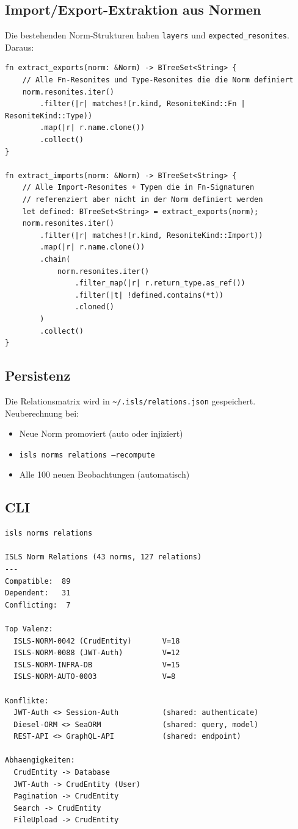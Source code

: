 \documentclass[11pt,a4paper]{article}
\begin{document}
\subsection{Import/Export-Extraktion aus Normen}

Die bestehenden Norm-Strukturen haben \texttt{layers} und \texttt{expected\_resonites}. Daraus:

\begin{lstlisting}[style=rust]
fn extract_exports(norm: &Norm) -> BTreeSet<String> {
    // Alle Fn-Resonites und Type-Resonites die die Norm definiert
    norm.resonites.iter()
        .filter(|r| matches!(r.kind, ResoniteKind::Fn | ResoniteKind::Type))
        .map(|r| r.name.clone())
        .collect()
}

fn extract_imports(norm: &Norm) -> BTreeSet<String> {
    // Alle Import-Resonites + Typen die in Fn-Signaturen
    // referenziert aber nicht in der Norm definiert werden
    let defined: BTreeSet<String> = extract_exports(norm);
    norm.resonites.iter()
        .filter(|r| matches!(r.kind, ResoniteKind::Import))
        .map(|r| r.name.clone())
        .chain(
            norm.resonites.iter()
                .filter_map(|r| r.return_type.as_ref())
                .filter(|t| !defined.contains(*t))
                .cloned()
        )
        .collect()
}
\end{lstlisting}

\subsection{Persistenz}

Die Relationsmatrix wird in \texttt{\textasciitilde/.isls/relations.json} gespeichert. Neuberechnung bei:
\begin{itemize}[nosep]
\item Neue Norm promoviert (auto oder injiziert)
\item \texttt{isls norms relations --recompute}
\item Alle 100 neuen Beobachtungen (automatisch)
\end{itemize}

\subsection{CLI}

\begin{lstlisting}[style=bash]
isls norms relations

ISLS Norm Relations (43 norms, 127 relations)
---
Compatible:  89
Dependent:   31
Conflicting:  7

Top Valenz:
  ISLS-NORM-0042 (CrudEntity)       V=18
  ISLS-NORM-0088 (JWT-Auth)         V=12
  ISLS-NORM-INFRA-DB                V=15
  ISLS-NORM-AUTO-0003               V=8

Konflikte:
  JWT-Auth <> Session-Auth          (shared: authenticate)
  Diesel-ORM <> SeaORM              (shared: query, model)
  REST-API <> GraphQL-API           (shared: endpoint)

Abhaengigkeiten:
  CrudEntity -> Database
  JWT-Auth -> CrudEntity (User)
  Pagination -> CrudEntity
  Search -> CrudEntity
  FileUpload -> CrudEntity
\end{lstlisting}
\end{document}
